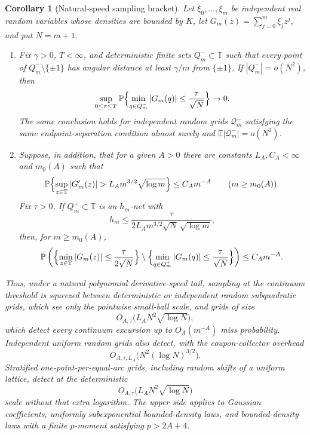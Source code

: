 \documentclass[11pt]{amsart}
\numberwithin{equation}{section}
\newtheorem{corollary}[theorem]{Corollary}
\theoremstyle{definition}
\theoremstyle{remark}
\newcommand{\T}{\mathbb T}
\newcommand{\Prob}{\mathbb P}
\newcommand{\Exp}{\mathbb E}
\newcommand{\abs}[1]{\left\lvert #1\right\rvert}
\begin{document}
\begin{corollary}[Natural-speed sampling bracket]
\label{cor:natural-speed-sampling-bracket}
Let \(\xi_0,\ldots,\xi_m\) be independent real random variables whose densities
are bounded by \(K\), let \(G_m(z)=\sum_{j=0}^m\xi_jz^j\), and put
\(N=m+1\).
\begin{enumerate}[label=\textup{(\roman*)}]
\item Fix \(\gamma>0\), \(T<\infty\), and deterministic finite sets
\(Q_m^-\subset\T\) such that every point of \(Q_m^-\setminus\{\pm1\}\) has
angular distance at least \(\gamma/m\) from \(\{\pm1\}\).  If
\(|Q_m^-|=o(N^2)\), then
\[
  \sup_{0\le\tau\le T}
  \Prob\Bigl\{\min_{q\in Q_m^-}\abs{G_m(q)}
      \le \frac{\tau}{\sqrt N}\Bigr\}\to0 .
\]
The same conclusion holds for independent random grids \(\mathcal Q_m^-\)
satisfying the same endpoint-separation condition almost surely and
\(\Exp|\mathcal Q_m^-|=o(N^2)\).
\item Suppose, in addition, that for a given \(A>0\) there are constants
\(L_A,C_A<\infty\) and \(m_0(A)\) such that
\[
  \Prob\Bigl\{\sup_{z\in\T}\abs{G_m'(z)}
      >L_A m^{3/2}\sqrt{\log m}\Bigr\}
  \le C_A m^{-A}
  \qquad(m\ge m_0(A)).
\]
Fix \(\tau>0\).  If \(Q_m^+\subset\T\) is an \(h_m\)-net with
\[
  h_m\le \frac{\tau}{2L_A m^{3/2}\sqrt N\,\sqrt{\log m}},
\]
then, for \(m\ge m_0(A)\),
\[
  \Prob\left(
    \Bigl\{\min_{z\in\T}\abs{G_m(z)}\le \frac{\tau}{2\sqrt N}\Bigr\}
    \setminus
    \Bigl\{\min_{q\in Q_m^+}\abs{G_m(q)}\le \frac{\tau}{\sqrt N}\Bigr\}
  \right)
  \le C_A m^{-A}.
\]
\end{enumerate}
Thus, under a natural polynomial derivative-speed tail, sampling at the
continuum threshold is squeezed between deterministic or independent random
subquadratic grids, which see only the pointwise small-ball scale, and grids of
size
\[
  O_{A,\tau}\bigl(L_A N^2\sqrt{\log N}\bigr),
\]
which detect every continuum excursion up to \(O_A(m^{-A})\) miss probability.
Independent uniform random grids also detect, with the coupon-collector
overhead
\[
  O_{A,\tau,L_A}\bigl(N^2(\log N)^{3/2}\bigr).
\]
Stratified one-point-per-equal-arc grids, including random shifts of a uniform
lattice, detect at the deterministic
\[
  O_{A,\tau}\bigl(L_A N^2\sqrt{\log N}\bigr)
\]
scale without that extra logarithm.
The upper side applies to Gaussian coefficients, uniformly subexponential
bounded-density laws, and bounded-density laws with a finite \(p\)-moment
satisfying \(p>2A+4\).
\end{corollary}
\end{document}
